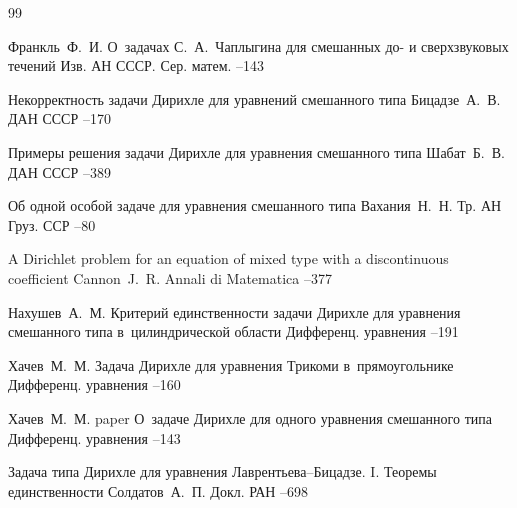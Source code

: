 \begin{thebibliography}{99}

\by Франкль~Ф.~И.
\paper О~задачах С.~А.~Чаплыгина для смешанных до- и сверхзвуковых течений
\jour Изв. АН СССР. Сер. матем.
--143


\paper Некорректность задачи Дирихле для уравнений смешанного типа
\by Бицадзе~А.~В.
\jour ДАН СССР
--170

\paper Примеры решения задачи Дирихле для уравнения смешанного типа 
\by Шабат~Б.~В. 
\jour ДАН СССР 
--389

\paper Об одной особой задаче для уравнения смешанного типа
\by Вахания~Н.~Н.
\jour Тр. АН Груз. ССР
--80

\paper A Dirichlet problem for an equation of mixed type with a discontinuous coefficient
\by Cannon~J.~R.
\jour Annali di Matematica 
--377

\by Нахушев~А.~М.
\paper Критерий единственности задачи Дирихле для уравнения смешанного типа в~цилиндрической области
\jour Дифференц. уравнения
--191

\by Хачев~М.~М.
\paper Задача Дирихле для уравнения Трикоми в~прямоугольнике
\jour Дифференц. уравнения
--160

\by Хачев~М.~М.
paper О~задаче Дирихле для одного уравнения смешанного типа
\jour Дифференц. уравнения
--143

\paper Задача типа Дирихле для уравнения Лаврентьева--Бицадзе. I. Теоремы единственности
\by Солдатов~А.~П.
\jour Докл. РАН
--698


\end{thebibliography}
